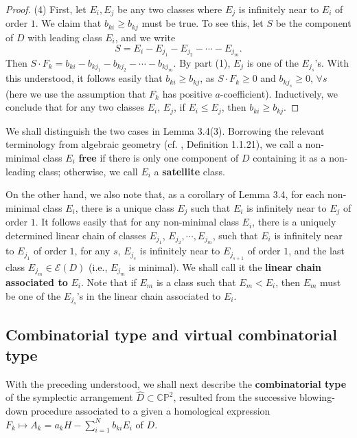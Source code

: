 \documentclass[11pt]{amsart}
\theoremstyle{plain}
\numberwithin{theorem}{section}
\theoremstyle{definition}
\newcommand{\C}{{\mathbb C}}
\renewcommand{\P}{{\mathbb P}}
\newcommand{\E}{{\mathcal E}}
\begin{document}
\begin{proof}
(4) First, let $E_i,E_j$ be any two classes where $E_j$ is infinitely near
to $E_i$ of order $1$. We claim that $b_{ki}\geq b_{kj}$ must be true. To see this, let $S$ be the component of $D$ with leading class $E_i$, and we write
$$
S=E_i-E_{j_1}-E_{j_2}-\cdots -E_{j_m}.
$$
Then $S\cdot F_k=b_{ki}-b_{kj_1}-b_{kj_2}-\cdots-b_{kj_m}$. By part (1), $E_j$ is one of the 
$E_{j_s}$'s. With this understood, it follows easily that $b_{ki}\geq b_{kj}$, as $S\cdot F_k\geq 0$ 
and $b_{kj_s}\geq 0$, $\forall s$ (here we use the assumption that $F_k$ has positive $a$-coefficient). Inductively, we conclude that for any two classes $E_i$, $E_j$, if $E_i\leq E_j$, then 
$b_{ki}\geq b_{kj}$.

\end{proof}

We shall distinguish the two cases in Lemma 3.4(3). Borrowing the relevant terminology from algebraic geometry 
(cf. \cite{AC}, Definition 1.1.21), we call a non-minimal class $E_i$ {\bf free} if there is only one component of $D$ containing it as a non-leading class; otherwise, we call $E_i$ a {\bf satellite} class. 

On the other hand, we also note that, as a corollary of Lemma 3.4, for each 
non-minimal class $E_i$, there is a unique class $E_j$ such that $E_i$ is infinitely near to $E_j$
of order $1$. It follows easily that for any non-minimal class $E_i$, there is a uniquely determined linear
chain of classes $E_{j_1}$, $E_{j_2}, \cdots, E_{j_m}$, such that $E_i$ is infinitely near to $E_{j_1}$
of order $1$, for any $s$, $E_{j_s}$ is infinitely near to $E_{j_{s+1}}$ of order $1$, and the last class
$E_{j_m}\in\E(D)$ (i.e., $E_{j_m}$ is minimal). We shall call it the {\bf linear chain associated to} $E_i$. Note that if $E_m$ is a class such that $E_m<E_i$, then $E_m$ must be one of the $E_{j_s}$'s
in the linear chain associated to $E_i$. 

\subsection{Combinatorial type and virtual combinatorial type}
With the preceding understood, we shall next describe the {\bf combinatorial type} of the symplectic arrangement 
$\hat{D}\subset \C\P^2$, resulted from the successive blowing-down procedure associated to a given 
a homological expression $F_k\mapsto A_k=a_k H-\sum_{i=1}^N b_{ki} E_i$ of $D$.
\end{document}
